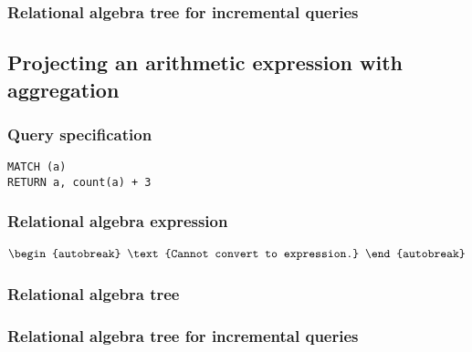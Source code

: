\subsubsection*{Relational algebra tree for incremental queries}


\subsection{Projecting an arithmetic expression with aggregation}

\subsubsection*{Query specification}

\begin{lstlisting}
MATCH (a)
RETURN a, count(a) + 3
\end{lstlisting}

\subsubsection*{Relational algebra expression}

\begin{align*}
\begin{autobreak}
\text{Cannot convert to expression.}
\end{autobreak}
\end{align*}

\subsubsection*{Relational algebra tree}


\subsubsection*{Relational algebra tree for incremental queries}

